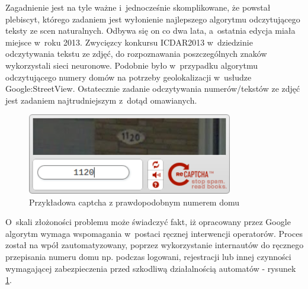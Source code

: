 Zagadnienie jest na tyle ważne i~jednocześnie skomplikowane, że
powstał plebiscyt, którego zadaniem jest wyłonienie najlepszego
algorytmu odczytującego teksty ze scen naturalnych. Odbywa się
on co dwa lata, a~ostatnia edycja miała miejsce w~roku 2013.
Zwycięzcy konkursu ICDAR2013 w~dziedzinie odczytywania tekstu ze
zdjęć, do rozpoznawania poszczególnych znaków wykorzystali sieci neuronowe.
Podobnie było w~przypadku algorytmu odczytującego numery domów na potrzeby
geolokalizacji w~usłudze Google:StreetView. Ostatecznie zadanie
odczytywania numerów/tekstów ze zdjęć jest zadaniem najtrudniejszym
z~dotąd omawianych.

\begin{figure}[h!]
    \centering
    \includegraphics[width=0.8\textwidth]{img/rev_captcha_street_view}
    \caption{Przykładowa captcha z prawdopodobnym numerem domu}
    \label{fig:google_street_view_captcha}
\end{figure}

O~skali złożoności problemu może świadczyć fakt, iż
opracowany przez Google algorytm wymaga wspomagania w~postaci
ręcznej interwencji
operatorów. Proces został na wpół zautomatyzowany, 
poprzez wykorzystanie internautów do ręcznego
przepisania numeru domu np. podczas logowani, rejestracji lub innej
czynności wymagającej zabezpieczenia przed szkodliwą działalnością
automatów - rysunek \ref{fig:google_street_view_captcha}.

